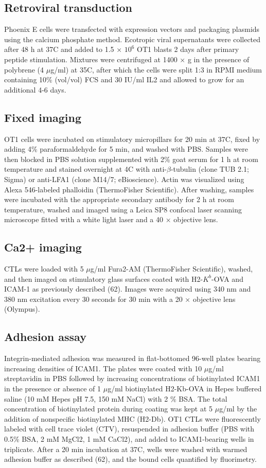 \subsection{Retroviral transduction}
Phoenix E cells were transfected with expression vectors and packaging plasmids using the calcium phosphate method. Ecotropic viral supernatants were collected after 48 h at 37\degree C and added to 1.5 × $10^{6}$ OT1 blasts 2 days after primary peptide stimulation. Mixtures were centrifuged at 1400 × g in the presence of polybrene (4 $\mu$g/ml) at 35\degree C, after which the cells were split 1:3 in RPMI medium containing 10\% (vol/vol) FCS and 30 IU/ml IL2 and allowed to grow for an additional 4-6 days.

\subsection{Fixed imaging}
OT1 cells were incubated on stimulatory micropillars for 20 min at 37\degree C, fixed by adding 4\% paraformaldehyde for 5 min, and washed with PBS. Samples were then blocked in PBS solution supplemented with 2\% goat serum for 1 h at room temperature and stained overnight at 4\degree C with anti-$\beta$-tubulin (clone TUB 2.1; Sigma) or anti-LFA1 (clone M14/7; eBioscience). Actin was visualized using Alexa 546-labeled phalloidin (ThermoFisher Scientific). After washing, samples were incubated with the appropriate secondary antibody for 2 h at room temperature, washed and imaged using a Leica SP8 confocal laser scanning microscope fitted with a white light laser and a 40 × objective lens.

\subsection{Ca2+ imaging}
CTLs were loaded with 5 $\mu$g/ml Fura2-AM (ThermoFisher Scientific), washed, and then imaged on stimulatory glass surfaces coated with H2-$K^{b}$-OVA and ICAM-1 as previously described (62). Images were acquired using 340 nm and 380 nm excitation every 30 seconds for 30 min with a 20 × objective lens (Olympus).

\subsection{Adhesion assay}
Integrin-mediated adhesion was measured in flat-bottomed 96-well plates bearing increasing densities of ICAM1. The plates were coated with 10 $\mu$g/ml streptavidin in PBS followed by increasing concentrations of biotinylated ICAM1 in the presence or absence of 1 $\mu$g/ml biotinylated H2-Kb-OVA in Hepes buffered saline (10 mM Hepes pH 7.5, 150 mM NaCl) with 2 \% BSA. The total concentration of biotinylated protein during coating was kept at 5 $\mu$g/ml by the addition of nonspecific biotinylated MHC (H2-Db). OT1 CTLs were fluorescently labeled with cell trace violet (CTV),
resuspended in adhesion buffer (PBS with 0.5\% BSA, 2 mM MgCl2, 1 mM CaCl2), and added to ICAM1-bearing wells in triplicate. After a 20 min incubation at 37\degree C, wells were washed with warmed adhesion buffer as described (62), and the bound cells quantified by fluorimetry.

